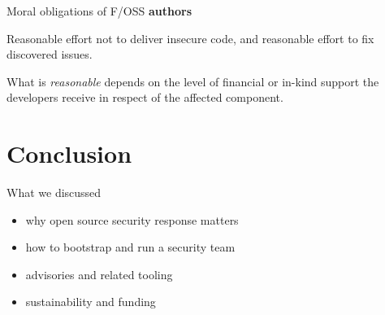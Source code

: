 \documentclass[ignorenonframetext,aspectratio=169,12pt]{beamer}
\begin{document}
\begin{frame}{Moral obligations of F/OSS {\bf authors}}
\large
\raggedright
Reasonable effort not to deliver insecure code, and reasonable
effort to fix discovered issues.

\bigskip

What is {\em reasonable} depends on the level of financial or in-kind
support the developers receive in respect of the affected component.
\end{frame}



\section{Conclusion}

\begin{frame}{What we discussed}
  \begin{itemize}
    \item why open source security response matters
    \item how to bootstrap and run a security team
    \item advisories and related tooling
    \item sustainability and funding
  \end{itemize}
\end{frame}


\end{document}
